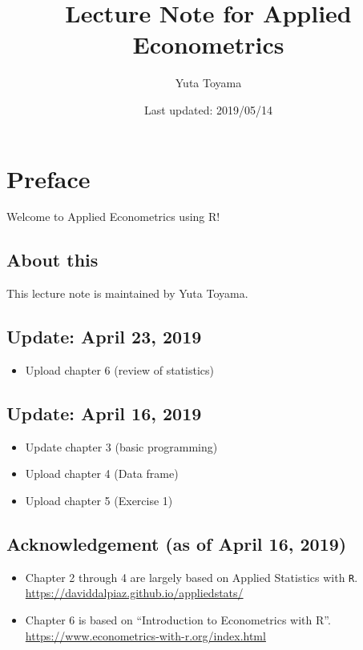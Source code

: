 \documentclass[]{book}
\title{Lecture Note for Applied Econometrics}
\author{Yuta Toyama}
\date{Last updated: 2019/05/14}
\providecommand{\tightlist}{%
  \setlength{\itemsep}{0pt}\setlength{\parskip}{0pt}}
\begin{document}
\maketitle

{
\setcounter{tocdepth}{1}
\tableofcontents
}
\hypertarget{preface}{%
\chapter{Preface}\label{preface}}

Welcome to Applied Econometrics using R!

\hypertarget{about-this}{%
\section{About this}\label{about-this}}

This lecture note is maintained by Yuta Toyama.

\hypertarget{update-april-23-2019}{%
\section{Update: April 23, 2019}\label{update-april-23-2019}}

\begin{itemize}
\tightlist
\item
  Upload chapter 6 (review of statistics)
\end{itemize}

\hypertarget{update-april-16-2019}{%
\section{Update: April 16, 2019}\label{update-april-16-2019}}

\begin{itemize}
\tightlist
\item
  Update chapter 3 (basic programming)
\item
  Upload chapter 4 (Data frame)
\item
  Upload chapter 5 (Exercise 1)
\end{itemize}

\hypertarget{acknowledgement-as-of-april-16-2019}{%
\section{Acknowledgement (as of April 16, 2019)}\label{acknowledgement-as-of-april-16-2019}}

\begin{itemize}
\tightlist
\item
  Chapter 2 through 4 are largely based on Applied Statistics with \texttt{R}. \url{https://daviddalpiaz.github.io/appliedstats/}
\item
  Chapter 6 is based on ``Introduction to Econometrics with R''. \url{https://www.econometrics-with-r.org/index.html}
\end{itemize}
\end{document}
